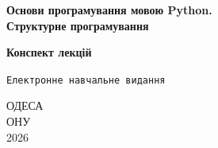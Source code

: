 \begin{titlepage}
	
	\LARGE \textbf{Основи програмування мовою Python.\\ Структурне програмування\\} %
	
	\vspace*{0.5\baselineskip} %
	
	\Large \textbf{Конспект лекцій}
	\vspace*{1.5\baselineskip}
	
	
	
	\vspace*{0.25\baselineskip}
	

	\texttt{Електронне навчальне видання}
	
	
	
	\vspace*{4\baselineskip}
	{ \large 
		ОДЕСА\\ \vspace{-1.5mm}
		ОНУ\\ \vspace{-2.5mm}
		2026 }%
	
	
	
	\pagebreak
	

\end{titlepage}
